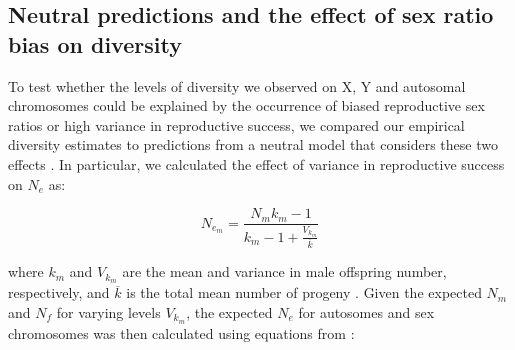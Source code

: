 \documentclass[9pt,twocolumn,twoside]{gsajnl}
\begin{document}

\subsection*{Neutral predictions and the effect of sex ratio bias on diversity}
To test whether the levels of diversity we observed on X, Y and autosomal chromosomes could be explained by the occurrence of biased reproductive sex ratios or high variance in reproductive success, we compared our empirical diversity estimates to predictions from a neutral model that considers these two effects \citep{kimura1964number}. In particular, we calculated the effect of variance in reproductive success on $N_{e}$ as:

\begin{equation}
N_{e_{m}}=\frac{N_{m}k_{m}-1}{k_{m}-1+\frac{V_{k_{m}}}{\overline{k}}} \label{eq:Vk}
\end{equation}

where $k_{m}$ and $V_{k_{m}}$ are the mean and variance in male offspring number, respectively, and $\overline{k}$ is the total mean number of progeny \citep{kimura1964number}. Given the expected $N_{m}$ and $N_{f}$ for varying levels $V_{k_{m}}$, the expected $N_{e}$ for autosomes and sex chromosomes was then calculated using equations from \citep{wright1931evolution}:
\end{document}
